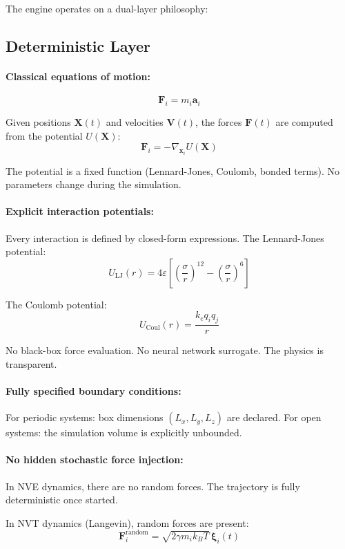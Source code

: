\documentclass[11pt]{article}
\begin{document}
The engine operates on a dual-layer philosophy:

\subsection{Deterministic Layer}

\paragraph{Classical equations of motion:}
\[
\mathbf{F}_i = m_i \mathbf{a}_i
\]

Given positions $\mathbf{X}(t)$ and velocities $\mathbf{V}(t)$, the forces $\mathbf{F}(t)$ are computed from the potential $U(\mathbf{X})$:
\[
\mathbf{F}_i = -\nabla_{\mathbf{x}_i} U(\mathbf{X})
\]

The potential is a fixed function (Lennard-Jones, Coulomb, bonded terms). No parameters change during the simulation.

\paragraph{Explicit interaction potentials:}

Every interaction is defined by closed-form expressions. The Lennard-Jones potential:
\[
U_{\text{LJ}}(r) = 4\varepsilon\left[\left(\frac{\sigma}{r}\right)^{12} - \left(\frac{\sigma}{r}\right)^6\right]
\]

The Coulomb potential:
\[
U_{\text{Coul}}(r) = \frac{k_e q_i q_j}{r}
\]

No black-box force evaluation. No neural network surrogate. The physics is transparent.

\paragraph{Fully specified boundary conditions:}

For periodic systems: box dimensions $(L_x, L_y, L_z)$ are declared.
For open systems: the simulation volume is explicitly unbounded.

\paragraph{No hidden stochastic force injection:}

In NVE dynamics, there are no random forces. The trajectory is fully deterministic once started.

In NVT dynamics (Langevin), random forces are present:
\[
\mathbf{F}_i^{\text{random}} = \sqrt{2\gamma m_i k_B T}\,\boldsymbol{\xi}_i(t)
\]
\end{document}
